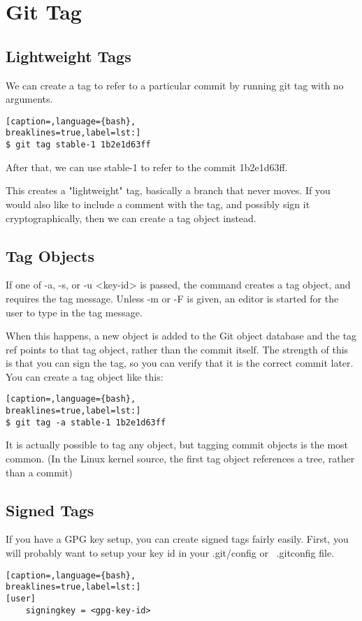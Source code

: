 \section{Git Tag}
\subsection{Lightweight Tags}
We can create a tag to refer to a particular commit by running git tag with no
arguments.
\lstset{basicstyle=\scriptsize, numbers=none, captionpos=b, tabsize=4}
\begin{lstlisting}[caption=,language={bash},
breaklines=true,label=lst:]
$ git tag stable-1 1b2e1d63ff
\end{lstlisting}

After that, we can use stable-1 to refer to the commit 1b2e1d63ff.

This creates a "lightweight" tag, basically a branch that never moves. If you
would also like to include a comment with the tag, and possibly sign it
cryptographically, then we can create a tag object instead.

\subsection{Tag Objects}
If one of -a, -s, or -u <key-id> is passed, the command creates a tag object,
and requires the tag message. Unless -m or -F is given, an editor is started
for the user to type in the tag message.

When this happens, a new object is added to the Git object database and the tag
ref points to that tag object, rather than the commit itself. The strength of
this is that you can sign the tag, so you can verify that it is the correct
commit later. You can create a tag object like this:
\lstset{basicstyle=\scriptsize, numbers=none, captionpos=b, tabsize=4}
\begin{lstlisting}[caption=,language={bash},
breaklines=true,label=lst:]
$ git tag -a stable-1 1b2e1d63ff
\end{lstlisting}

It is actually possible to tag any object, but tagging commit objects is the
most common. (In the Linux kernel source, the first tag object references a
tree, rather than a commit)

\subsection{Signed Tags}
If you have a GPG key setup, you can create signed tags fairly easily. First,
you will probably want to setup your key id in your .git/config or ~.gitconfig
file.
\lstset{basicstyle=\scriptsize, numbers=none, captionpos=b, tabsize=4}
\begin{lstlisting}[caption=,language={bash},
breaklines=true,label=lst:]
[user]
    signingkey = <gpg-key-id>
\end{lstlisting}

